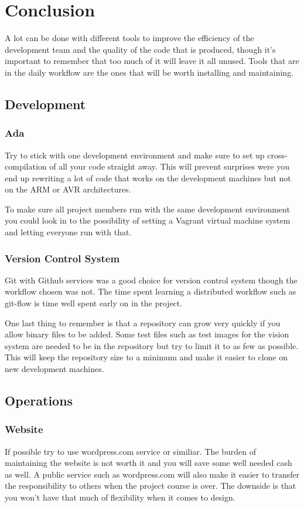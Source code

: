 \section{Conclusion}\label{sec:conclusion}
A lot can be done with different tools to improve the efficiency of the development
team and the quality of the code that is produced, though it's important to remember
that too much of it will leave it all unused. Tools that are in the daily workflow
are the ones that will be worth installing and maintaining.

\subsection{Development}
\subsubsection{Ada}
Try to stick with one development environment and make sure to set up cross-compilation
of all your code straight away. This will prevent surprises were you end up rewriting
a lot of code that works on the development machines but not on the ARM or AVR
architectures.

To make sure all project members run with the same development environment you
could look in to the possibility of setting a Vagrant \cite{web:vagrant}
virtual machine system and letting everyone run with that.

\subsubsection{Version Control System}
Git with Github services was a good choice for version control system though
the workflow chosen was not. The time spent learning a distributed workflow such
as git-flow is time well spent early on in the project.

One last thing
to remember is that a repository can grow very quickly if you allow binary files
to be added. Some test files such as test images for the vision system are needed
to be in the repository but try to limit it to as few as possible. This will
keep the repository size to a minimum and make it easier to clone on new
development machines.

\subsection{Operations}
\subsubsection{Website}
If possible try to use wordpress.com service or similiar. The burden of
maintaining the website is not worth it and you will save some well needed cash 
as well. A public service such as wordpress.com
will also make it easier to transfer the responsibility to others when the project
course is over. The downside is that you won't have that much of flexibility when
it comes to design.
